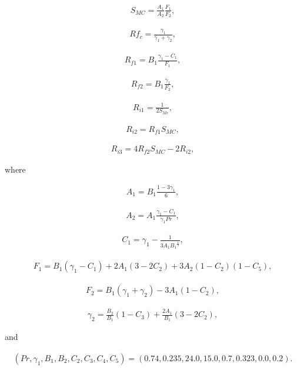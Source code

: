 \begin{eqnarray}S_{MC}=\frac{A_1}{A_2}\frac{F_1}{F_2},\end{eqnarray}

\begin{eqnarray}Rf_c=\frac{\gamma_1}{\gamma_1+\gamma_2},\end{eqnarray}

\begin{eqnarray}R_{f1}=B_1\frac{\gamma_1-C_1}{F_1},\end{eqnarray}

\begin{eqnarray}R_{f2}=B_1\frac{\gamma_1}{F_2},\end{eqnarray}

\begin{eqnarray}R_{i1}=\frac{1}{2S_{Mc}},\end{eqnarray}

\begin{eqnarray}R_{i2}=R_{f1}S_{MC},\end{eqnarray}

\begin{eqnarray}R_{i3}=4R_{f2}S_{MC}-2R_{i2},\end{eqnarray}

where

\begin{eqnarray}A_1=B_1\frac{1-3\gamma_1}{6},\end{eqnarray}

\begin{eqnarray}A_2=A_1\frac{\gamma_1-C_1}{\gamma_1 Pr},\end{eqnarray}

\begin{eqnarray}C_1=\gamma_1-\frac{1}{3A_1{B_1}^{\frac{1}{3}}},\end{eqnarray}

\begin{eqnarray}F_1=B_1(\gamma_1-C_1)+2A_1(3-2C_2)+3A_2(1-C_2)(1-C_5),\end{eqnarray}

\begin{eqnarray}F_2=B_1(\gamma_1+\gamma_2)-3A_1(1-C_2),\end{eqnarray}

\begin{eqnarray}\gamma_2=\frac{B_2}{B_1}\left(1-C_3\right)+\frac{2A_1}{B_1}\left(3-2C_2\right),\end{eqnarray}

and

\begin{eqnarray}
(Pr,\gamma_1,B_1,B_2,C_2,C_3,C_4,C_5)=(0.74,0.235,24.0,15.0,0.7,0.323,0.0,0.2).
\end{eqnarray}

